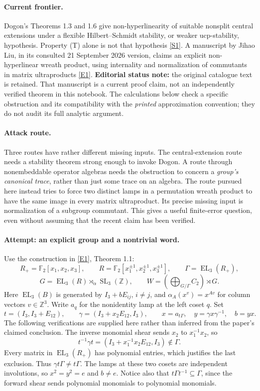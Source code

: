 \documentclass[11pt,a4paper]{article}
\newcommand{\Z}{\mathbb{Z}}
\newcommand{\F}{\mathbb{F}}
\newcommand{\sref}[2]{\hyperlink{source:#1:#2}{[S#2]}}
\newcommand{\eref}[2]{\hyperlink{extra:#1:#2}{[E#2]}}
\numberwithin{equation}{section}
\begin{document}
\paragraph{Current frontier.}
Dogon's Theorems 1.3 and 1.6 give non-hyperlinearity of suitable nonsplit
central extensions under a flexible Hilbert--Schmidt stability, or weaker
ucp-stability, hypothesis. Property (T) alone is not that hypothesis
\sref{statement}{1}. A manuscript by Jihao Liu, in its consulted 21 September 2026 version, claims an
explicit non-hyperlinear wreath product, using internality and normalization
of commutants in matrix ultraproducts \eref{statement}{1}. \textbf{Editorial status
note:} the original catalogue text is retained. That manuscript is a current
proof claim, not an independently verified theorem in this notebook. The
calculations below check a specific obstruction and its compatibility with
the \emph{printed} approximation convention; they do not audit its full
analytic argument.

\paragraph{Attack route.}
Three routes have rather different missing inputs. The central-extension
route needs a stability theorem strong enough to invoke Dogon. A route
through nonembeddable operator algebras needs the obstruction to concern a
\emph{group's canonical trace}, rather than just some trace on an algebra.
The route pursued here instead tries to force two distinct lamps in a
permutation wreath product to have the same image in every matrix
ultraproduct. Its precise missing input is normalization of a subgroup
commutant. This gives a useful finite-error question, even without assuming
that the recent claim has been verified.

\paragraph{Attempt: an explicit group and a nontrivial word.}
Use the construction in \eref{statement}{1}, Theorem 1.1:
\[
 R_+=\F_2[x_1,x_2,x_3],\qquad
 R=\F_2[x_1^{\pm1},x_2^{\pm1},x_3^{\pm1}],\qquad
 \Gamma=\operatorname{EL}_3(R_+),
\]
\[
 G=\operatorname{EL}_3(R)\rtimes_\alpha\operatorname{SL}_3(\Z),\qquad
 W=\left(\bigoplus_{G/\Gamma}C_2\right)\rtimes G.
\]
Here $\operatorname{EL}_3(B)$ is generated by $I_3+bE_{ij}$, $i\ne j$,
and $\alpha_A(x^v)=x^{Av}$ for column vectors $v\in\Z^3$.
Write $a_q$ for the nonidentity lamp at the left coset $q$. Set
\[
 t=(I_3,I_3+E_{12}),\qquad
 \gamma=(I_3+x_2E_{12},I_3),\qquad
 x=a_{t\Gamma},\quad y=\gamma x\gamma^{-1},\quad b=yx.
\]
The following verifications are supplied here rather than inferred from the
paper's claimed conclusion. The inverse monomial shear sends $x_2$ to
$x_1^{-1}x_2$, so
\[
 t^{-1}\gamma t=(I_3+x_1^{-1}x_2E_{12},I_3)\notin\Gamma.
\]
Every matrix in $\operatorname{EL}_3(R_+)$ has polynomial entries, which
justifies the last exclusion. Thus $\gamma t\Gamma\ne t\Gamma$. The lamps
at these two cosets are independent involutions, so $x^2=y^2=e$ and
$b\ne e$. Notice also that $t\Gamma t^{-1}\subseteq\Gamma$, since the
forward shear sends polynomial monomials to polynomial monomials.
\end{document}
